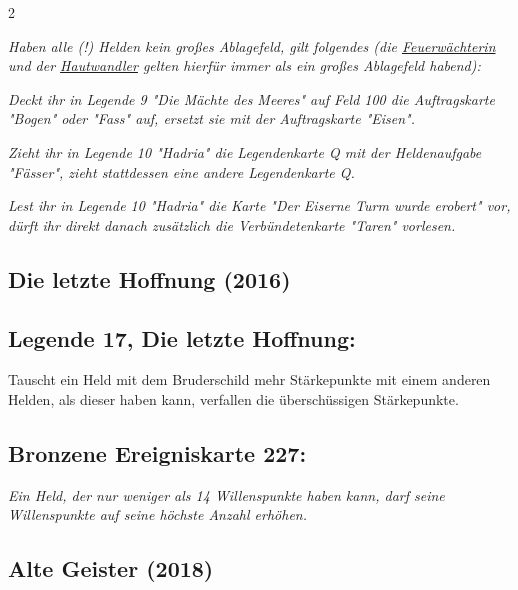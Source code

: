 \documentclass[10pt, a4paper, oneside]{book}
\newcommand{\fan}[1]{\textit{#1}}
\begin{document}
\begin{multicols*}{2}
\begin{bgcolor}
\fan{Haben alle (!) Helden kein großes Ablagefeld, gilt folgendes (die \hyperref[Feuerwächterin]{Feuerwächterin} und der \hyperref[Hautwandler]{Hautwandler} gelten hierfür immer als ein großes Ablagefeld habend):}

\bullet{} \fan{Deckt ihr in Legende 9 "Die Mächte des Meeres" auf Feld 100 die Auftragskarte "Bogen" oder "Fass" auf, ersetzt sie mit der Auftragskarte "Eisen".}

\bullet{} \fan{Zieht ihr in Legende 10 "Hadria" die Legendenkarte Q mit der Heldenaufgabe "Fässer", zieht stattdessen eine andere Legendenkarte Q.}

\bullet{} \fan{Lest ihr in Legende 10 "Hadria" die Karte "Der Eiserne Turm wurde erobert" vor, dürft ihr direkt danach zusätzlich die Verbündetenkarte "Taren" vorlesen.}

\end{bgcolor}



\begin{bgcolor}
\section{Die letzte Hoffnung (2016)}





\subsection{Legende 17, Die letzte Hoffnung:}

Tauscht ein Held mit dem Bruderschild mehr Stärkepunkte mit einem anderen Helden, als dieser haben kann, verfallen die überschüssigen Stärkepunkte.


\subsection{Bronzene Ereigniskarte 227:}

\fan{Ein Held, der nur weniger als 14 Willenspunkte haben kann, darf seine Willenspunkte auf seine höchste Anzahl erhöhen.}


\end{bgcolor}





\begin{bgcolor}[color-AG]
\section{Alte Geister (2018)}


\end{bgcolor}
\end{multicols*}
\end{document}
